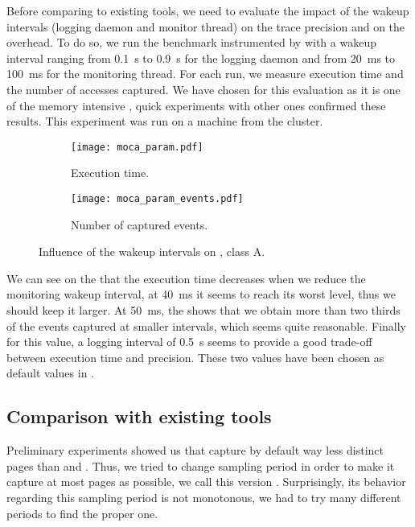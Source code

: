 Before comparing \Moca to existing tools, we need to evaluate the impact of
the wakeup intervals (logging daemon and monitor thread) on the trace
precision and on the overhead. To do so, we run the \IS benchmark instrumented by \Moca with
a wakeup interval ranging from \SI{0.1}{s} to  \SI{0.9}{s} for the logging daemon and from \SI{20}{ms} to
\SI{100}{ms} for the monitoring thread. For each run, we measure \IS execution time and the number of
accesses captured. We have chosen \IS for this evaluation as it is one of the memory intensive \NPB,
quick experiments with other ones confirmed these results. This experiment was
run on a machine from the \Edel cluster.

\begin{figure}[htb]
    \centering
    \begin{subfigure}{\linewidth}
        \texttt{[image: moca\_param.pdf]}
        \caption{Execution time.}
        \label{fig:param_time}
    \end{subfigure}
    \begin{subfigure}{\linewidth}
        \texttt{[image: moca\_param\_events.pdf]}
        \caption{Number of captured events.}
        \label{fig:param_evts}
    \end{subfigure}
    \caption{Influence of the wakeup intervals on \IS, class A.}
    \label{fig:param}
\end{figure}

We can see on the  that the execution time decreases when we
reduce the monitoring wakeup interval, at \SI{40}{ms}
it seems to reach its worst level, thus we should keep it larger. At \SI{50}{ms}, the
 shows that we obtain more than two thirds of the events captured
at smaller intervals, which seems quite reasonable. Finally for this value, a logging
interval of \SI{0.5}{s} seems to provide a good trade-off  between
execution time and precision.
These two values have been chosen as default values in \Moca.



\subsection{Comparison with existing tools}
\label{sec:expe-ovh}

Preliminary experiments showed us that \Mitos capture by
default way less distinct pages than \TABARNAC and \Moca. Thus, we tried to change \Mitos
sampling period in order to make it capture at most pages as possible, 
we call this version \MitosTun. Surprisingly, its behavior regarding this sampling period
is not monotonous, we had to try many different periods to find the proper one.

